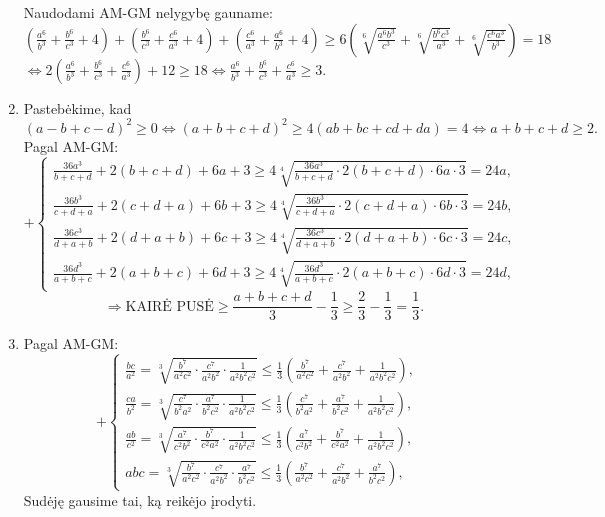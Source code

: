 \begin{enumerate}
Naudodami AM-GM nelygybę gauname:\\
$\left(\frac{a^6}{b^3}+\frac{b^6}{c^3}+4\right)+\left(\frac{b^6}{c^3}+\frac{c^6}{a^3}+4\right)+\left(\frac{c^6}{a^3}+\frac{a^6}{b^3}+4\right)\geq6\left(\sqrt[6]{\frac{a^6b^3}{c^3}}+\sqrt[6]{\frac{b^6c^3}{a^3}}+\sqrt[6]{\frac{c^6a^3}{b^3}}\right)=18$\\
$\Leftrightarrow2\left(\frac{a^6}{b^3}+\frac{b^6}{c^3}+\frac{c^6}{a^3}\right)+12\geq18\Leftrightarrow\frac{a^6}{b^3}+\frac{b^6}{c^3}+\frac{c^6}{a^3}\geq3.$
\item 
Pastebėkime, kad \\
$(a-b+c-d)^2\geq0\Leftrightarrow(a+b+c+d)^2\geq4(ab+bc+cd+da)=4\Leftrightarrow
a+b+c+d\geq2.$ Pagal AM-GM: $$+\left\{\begin{array}{ll}
\frac{36a^3}{b+c+d}+2(b+c+d)+6a+3\geq4\sqrt[4]{\frac{36a^3}{b+c+d}\cdot2(b+c+d)\cdot6a\cdot3}=24a,&\\
\frac{36b^3}{c+d+a}+2(c+d+a)+6b+3\geq4\sqrt[4]{\frac{36b^3}{c+d+a}\cdot2(c+d+a)\cdot6b\cdot3}=24b,&\\
\frac{36c^3}{d+a+b}+2(d+a+b)+6c+3\geq4\sqrt[4]{\frac{36c^3}{d+a+b}\cdot2(d+a+b)\cdot6c\cdot3}=24c,&\\
\frac{36d^3}{a+b+c}+2(a+b+c)+6d+3\geq4\sqrt[4]{\frac{36d^3}{a+b+c}\cdot2(a+b+c)\cdot6d\cdot3}=24d,&
\end{array}\right.$$ $$\Rightarrow\mbox{KAIRĖ
PUSĖ}\geq{\frac{a+b+c+d}{3}}-\frac{1}{3}\geq\frac{2}{3}-\frac{1}{3}=\frac{1}{3}.$$
\item 
Pagal AM-GM: $$+\left\{\begin{array}{ll}
\frac{bc}{a^2}=\sqrt[3]{\frac{b^7}{a^2c^2}\cdot\frac{c^7}{a^2b^2}\cdot\frac{1}{a^2b^2c^2}}\leq\frac{1}{3}\left(\frac{b^7}{a^2c^2}+\frac{c^7}{a^2b^2}+\frac{1}{a^2b^2c^2}\right),&\\
\frac{ca}{b^2}=\sqrt[3]{\frac{c^7}{b^2a^2}\cdot\frac{a^7}{b^2c^2}\cdot\frac{1}{a^2b^2c^2}}\leq\frac{1}{3}\left(\frac{c^7}{b^2a^2}+\frac{a^7}{b^2c^2}+\frac{1}{a^2b^2c^2}\right),&\\
\frac{ab}{c^2}=\sqrt[3]{\frac{a^7}{c^2b^2}\cdot\frac{b^7}{c^2a^2}\cdot\frac{1}{a^2b^2c^2}}\leq\frac{1}{3}\left(\frac{a^7}{c^2b^2}+\frac{b^7}{c^2a^2}+\frac{1}{a^2b^2c^2}\right),&\\
abc=\sqrt[3]{\frac{b^7}{a^2c^2}\cdot\frac{c^7}{a^2b^2}\cdot\frac{a^7}{b^2c^2}}\leq\frac{1}{3}\left(\frac{b^7}{a^2c^2}+\frac{c^7}{a^2b^2}+\frac{a^7}{b^2c^2}\right),&
\end{array}\right.$$ Sudėję gausime tai, ką reikėjo įrodyti.
\end{enumerate} 
